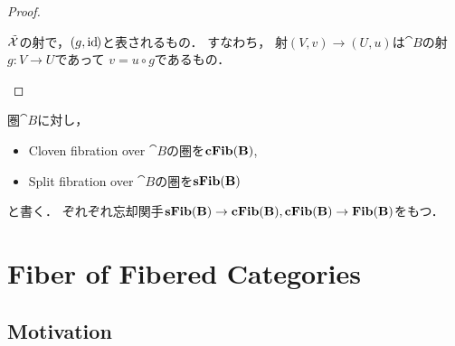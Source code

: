 \documentclass[a4paper, dvipdfmx]{jsarticle}
\begin{document}
\begin{proof}
\begin{description}[labelindent=1cm]
            \item[Arrows.]
                $\tilde{\mathcal{X}}$の射で，$(g, \mathrm{id}_{\!})$と表されるもの．
                すなわち，
                射$(V, v) \to (U, u)$は$\cat{B}$の射$g \colon V \to U$であって
                $v=u \circ g$であるもの．
                \begin{center}
                \end{center}
        \end{description}
    \end{proof}

    \begin{Def}
        圏$\cat{B}$に対し，
        \begin{itemize}
            \item Cloven fibration over $\cat{B}$の圏を$\mathbf{cFib}(\mathbf{B})$,
            \item Split fibration over $\cat{B}$の圏を$\mathbf{sFib}(\mathbf{B})$
        \end{itemize}
        と書く．
        ぞれぞれ忘却関手$\mathbf{sFib}(\mathbf{B}) \to \mathbf{cFib}(\mathbf{B}), \mathbf{cFib}(\mathbf{B}) \to \mathbf{Fib}(\mathbf{B})$をもつ．
    \end{Def}

\section{Fiber of Fibered Categories}
\subsection{Motivation}
\end{document}
